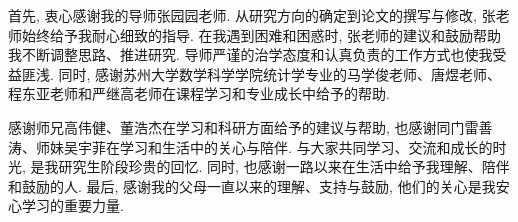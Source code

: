 \documentclass[a4paper,openay,14pt]{ctexbook}
\numberwithin{equation}{section}
\numberwithin{lem}{section}
\begin{document}
首先,  衷心感谢我的导师张园园老师. 从研究方向的确定到论文的撰写与修改,  张老师始终给予我耐心细致的指导. 在我遇到困难和困惑时,  张老师的建议和鼓励帮助我不断调整思路、推进研究. 导师严谨的治学态度和认真负责的工作方式也使我受益匪浅. 同时,  感谢苏州大学数学科学学院统计学专业的马学俊老师、唐煜老师、程东亚老师和严继高老师在课程学习和专业成长中给予的帮助.

感谢师兄高伟健、董浩杰在学习和科研方面给予的建议与帮助,  也感谢同门雷善涛、师妹吴宇菲在学习和生活中的关心与陪伴. 与大家共同学习、交流和成长的时光,  是我研究生阶段珍贵的回忆. 同时,  也感谢一路以来在生活中给予我理解、陪伴和鼓励的人. 最后,  感谢我的父母一直以来的理解、支持与鼓励,  他们的关心是我安心学习的重要力量.

\end{document}
